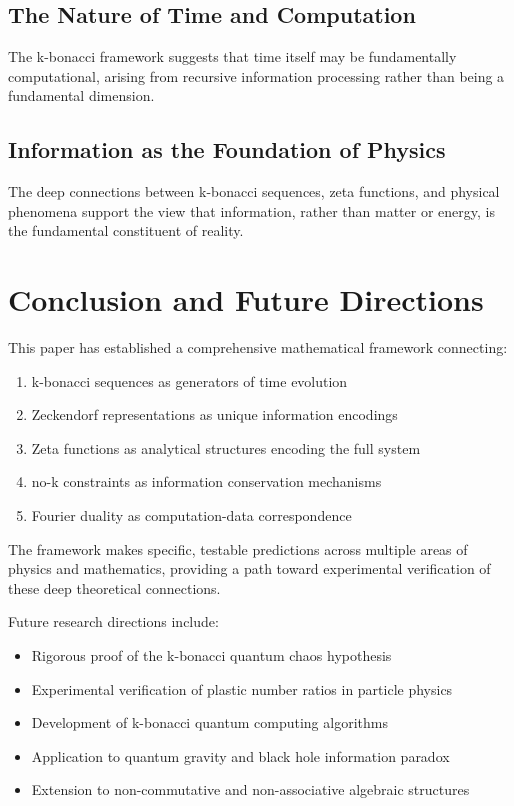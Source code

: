 \documentclass[12pt]{article}
\theoremstyle{plain}
\theoremstyle{definition}
\begin{document}
\subsection{The Nature of Time and Computation}

The k-bonacci framework suggests that time itself may be fundamentally computational, arising from recursive information processing rather than being a fundamental dimension.

\subsection{Information as the Foundation of Physics}

The deep connections between k-bonacci sequences, zeta functions, and physical phenomena support the view that information, rather than matter or energy, is the fundamental constituent of reality.

\section{Conclusion and Future Directions}

This paper has established a comprehensive mathematical framework connecting:

\begin{enumerate}
\item k-bonacci sequences as generators of time evolution
\item Zeckendorf representations as unique information encodings
\item Zeta functions as analytical structures encoding the full system
\item no-k constraints as information conservation mechanisms
\item Fourier duality as computation-data correspondence
\end{enumerate}

The framework makes specific, testable predictions across multiple areas of physics and mathematics, providing a path toward experimental verification of these deep theoretical connections.

Future research directions include:
\begin{itemize}
\item Rigorous proof of the k-bonacci quantum chaos hypothesis
\item Experimental verification of plastic number ratios in particle physics
\item Development of k-bonacci quantum computing algorithms
\item Application to quantum gravity and black hole information paradox
\item Extension to non-commutative and non-associative algebraic structures
\end{itemize}
\end{document}
